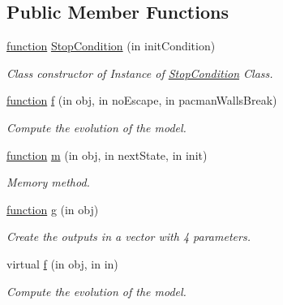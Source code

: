 \subsection*{Public Member Functions}
\begin{DoxyCompactItemize}
\item 
\hyperlink{_plan__desuma_functions_8m_ac2ffb26d6f42d3bbcd7847b0873403f4}{function} \hyperlink{class_stop_condition_a998151731b2f85cb0f3e0cbc7d82bf96}{Stop\+Condition} (in init\+Condition)
\begin{DoxyCompactList}\small\item\em Class constructor of Instance of \hyperlink{class_stop_condition}{Stop\+Condition} Class. \end{DoxyCompactList}\item 
\hyperlink{_plan__desuma_functions_8m_ac2ffb26d6f42d3bbcd7847b0873403f4}{function} \hyperlink{class_stop_condition_abcffcbb16870f569058af2fd7823c5dd}{f} (in obj, in no\+Escape, in pacman\+Walls\+Break)
\begin{DoxyCompactList}\small\item\em Compute the evolution of the model. \end{DoxyCompactList}\item 
\hyperlink{_plan__desuma_functions_8m_ac2ffb26d6f42d3bbcd7847b0873403f4}{function} \hyperlink{class_stop_condition_a3140f24c6c4b80037b7d4f521c6ae2d3}{m} (in obj, in next\+State, in init)
\begin{DoxyCompactList}\small\item\em Memory method. \end{DoxyCompactList}\item 
\hyperlink{_plan__desuma_functions_8m_ac2ffb26d6f42d3bbcd7847b0873403f4}{function} \hyperlink{class_stop_condition_a07dadfabe92bf9a144b8a862720e7746}{g} (in obj)
\begin{DoxyCompactList}\small\item\em Create the outputs in a vector with 4 parameters. \end{DoxyCompactList}\item 
virtual \hyperlink{class_model_s_e_d_ac36f9451c43b120828af4380858f2024}{f} (in obj, in in)
\begin{DoxyCompactList}\small\item\em Compute the evolution of the model. \end{DoxyCompactList}\end{DoxyCompactItemize}
